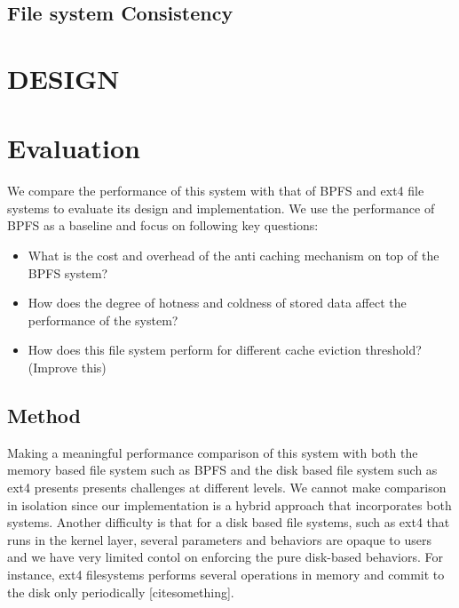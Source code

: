 \documentclass[letterpaper, 10 pt, conference]{ieeeconf}  %
\begin{document}
\subsection{File system Consistency}

\section{DESIGN}

\begin{figure}
\centering
\vspace{-0.2in}
\vspace{-0.1in}
\end{figure}

\section{Evaluation}

We compare the performance of this system with that of BPFS and ext4 file systems to evaluate its design and implementation. We use the performance of BPFS as a baseline and focus on following key questions:
\begin{itemize}
\item What is the cost and overhead of the anti caching mechanism on top of the BPFS system?
\item How does the degree of hotness and coldness of stored data affect the performance of the system?
\item How does this file system perform for different cache eviction threshold? (Improve this)
\end{itemize}

\subsection{Method}
Making a meaningful performance comparison of this system with both the memory based file system such as BPFS and the disk based file system such as ext4 presents presents challenges at different levels. We cannot make comparison in isolation since our implementation is a hybrid approach that incorporates both systems. Another difficulty is that for a disk based file systems, such as ext4 that runs in the kernel layer, several parameters and behaviors are opaque to users and we have very limited contol on enforcing the pure disk-based behaviors. For instance, ext4 filesystems performs several operations in memory and commit to the disk only periodically [cite{something}]. 
\end{document}
